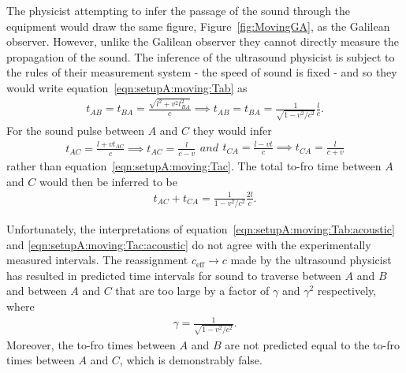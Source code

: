 \documentclass[10pt, fleqn,final,showtrims,oldfontcommands]{article} %
\newcommand{\sub}[1]{\begin{subequations}#1\end{subequations}}
\newcommand{\eqnref}[1]{\ref{eqn:#1}}
\newcommand{\figref}[1]{Figure~\ref{fig:#1}}
\newcommand{\eff}{{\textrm{eff}}}
\begin{document}
The physicist attempting to infer the passage of the sound through the equipment %
 would  draw the same figure, \figref{MovingGA}, as the Galilean observer.
However, unlike the Galilean observer they cannot directly measure the propagation of the sound.
The inference of the ultrasound physicist is subject to the rules of their measurement system - 
the speed of sound is fixed - and so they would write equation~\ref{eqn:setupA:moving:Tab} as 
\begin{align}
  \label{eqn:setupA:moving:Tab:acoustic}
  t_{AB} = t_{BA} =  \frac{\sqrt{l^2+v^2t_{BA}^2}}{c} \implies t_{AB} =  t_{BA} =\frac{1}{\sqrt{1-v^2/c^2}} \frac{l}{c}.
\end{align}
For the sound pulse between $A$ and $C$  they would infer
\sub{
\label{eqn:setupA:moving:Tac:acoustic}
\begin{align}
 t_{AC} =  \frac{l+vt_{AC}}{c}\implies t_{AC} = \frac{l}{c-v}
\end{align}
and 
\begin{align}
 t_{CA} =  \frac{l-vt}{c} \implies t_{CA} = \frac{l}{c+v}
\end{align}
}
rather than  equation~\ref{eqn:setupA:moving:Tac}.
The total to-fro time between $A$ and $C$ would then be inferred to be
\begin{align}
t_{AC}+t_{CA} = \frac{1}{{1-v^2/c^2}} \frac{2l}{c}.
\end{align}

Unfortunately, the interpretations of equation~\ref{eqn:setupA:moving:Tab:acoustic} and \ref{eqn:setupA:moving:Tac:acoustic} do not agree with the
experimentally measured intervals.
The reassignment $c_\eff \rightarrow c$ made by the ultrasound physicist 
has resulted in predicted time intervals for sound to traverse between $A$ and $B$ and between $A$ and $C$ that are too large
by a factor of $\gamma$ and $\gamma^2$ respectively,
where 
\begin{align}
  \gamma = \frac{1}{\sqrt{1-v^2/c^2}}.
  \label{eqn:gamma}
\end{align}
Moreover, the to-fro times between $A$ and $B$ are not predicted equal to the to-fro times between $A$ and $C$,
which is demonstrably false.
\end{document}
